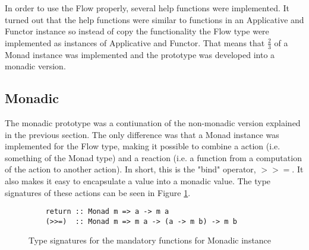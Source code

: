 In order to use the Flow properly, several help functions were implemented. It turned out that the help functions were similar to functions in an Applicative and Functor instance so instead of copy the functionality the Flow type were implemented as instances of Applicative and Functor. That means that \(\frac{2}{3}\) of a Monad instance was implemented and the prototype was developed into a monadic version.
\subsection{Monadic}
The monadic prototype was a contiunation of the non-monadic version explained in the previous section. The only difference was that a Monad instance was implemented for the Flow type, making it possible to combine a action (i.e. something of the Monad type) and a reaction (i.e. a function from a computation of the action to another action). In short, this is the "bind" operator, \(>>=\). It also makes it easy to encapsulate a value into a monadic value. The type signatures of these actions can be seen in Figure \ref{fig:monadic_actions}. 
\begin{figure}[h]
  \lstset{language=Haskell}
  \begin{lstlisting}
    return :: Monad m => a -> m a
    (>>=)  :: Monad m => m a -> (a -> m b) -> m b
  \end{lstlisting}
  \caption{Type signatures for the mandatory functions for Monadic instance}
  \label{fig:monadic_actions}
\end{figure}
